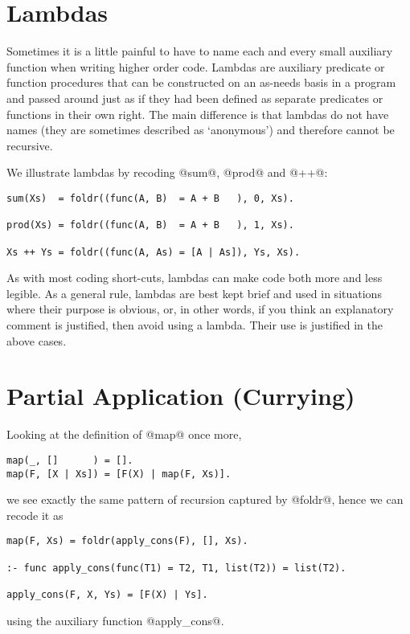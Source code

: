 \section{Lambdas}

Sometimes it is a little painful to have to name each and every small
auxiliary function when writing higher order code.  Lambdas are
auxiliary predicate or function procedures that can be constructed on an
as-needs basis in a program and passed around just as if they had been
defined as separate predicates or functions in their own right.  The
main difference is that lambdas do not have names (they are sometimes
described as `anonymous') and therefore cannot be recursive.

We illustrate lambdas by recoding @sum@, @prod@ and @++@:
\begin{verbatim}
sum(Xs)  = foldr((func(A, B)  = A + B   ), 0, Xs).

prod(Xs) = foldr((func(A, B)  = A + B   ), 1, Xs).

Xs ++ Ys = foldr((func(A, As) = [A | As]), Ys, Xs).
\end{verbatim}
As with most coding short-cuts, lambdas can make code both more and less
legible.  As a general rule, lambdas are best kept brief and used in
situations where their purpose is obvious, or, in other words, if you
think an explanatory comment is justified, then avoid using a lambda.
Their use is justified in the above cases.





\section{Partial Application (Currying)}

Looking at the definition of @map@ once more,
\begin{verbatim}
map(_, []      ) = [].
map(F, [X | Xs]) = [F(X) | map(F, Xs)].
\end{verbatim}
we see exactly the same pattern of recursion captured by @foldr@, hence
we can recode it as
\begin{verbatim}
map(F, Xs) = foldr(apply_cons(F), [], Xs).

:- func apply_cons(func(T1) = T2, T1, list(T2)) = list(T2).

apply_cons(F, X, Ys) = [F(X) | Ys].
\end{verbatim}
using the auxiliary function @apply_cons@.  

